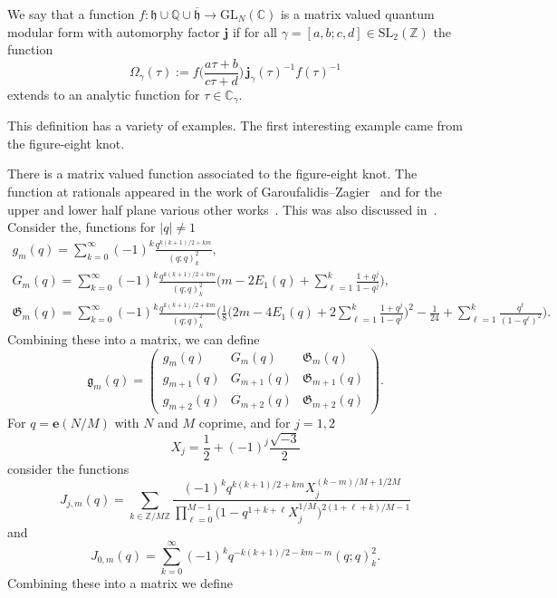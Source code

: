 \documentclass[pdftex]{sigma}
\numberwithin{equation}{section}
\def\BZ{\mathbb{Z}}
\def\BQ{\mathbb{Q}}
\def\BC{\mathbb{C}}
\def\SL{\mathrm{SL}}
\def\be{\begin{equation}}
\def\ee{\end{equation}}
\def\e{\mathbf e}
\def\SL{\mathrm{SL}}
\def\GL{\mathrm{GL}}
\def\UHP{\mathfrak{h}}
\def\Om{\Omega}
\def\BZ{\mathbb Z}
\def\BQ{\mathbb Q}
\def\BC{\mathbb C}
\def\SL{\mathrm{SL}}
\def\be{\begin{equation}}
\def\ee{\end{equation}}
\def\GL{\mathrm{GL}}
\def\Om{\Omega}
\begin{document}
\begin{Definition}
We say that a function $f\colon \UHP\cup\BQ\cup\overline{\UHP}\rightarrow\GL_{N}(\BC)$ is a matrix valued quantum modular form with automorphy factor $\mathbf{j}$ if for all $\gamma=[a,b;c,d]\in\SL_{2}(\BZ)$ the function
\be\label{eq:cocyc}
 \Om_{\gamma}(\tau):=f\biggl(\frac{a\tau+b}{c\tau+d}\biggr)\,\mathbf{j}_{\gamma}(\tau)^{-1}f(\tau)^{-1}
\ee
extends to an analytic function for $\tau\in\BC_{\gamma}$.
\end{Definition}
This definition has a variety of examples. The first interesting example came from the figure-eight knot.
\begin{Example}\label{ex:41}
There is a matrix valued function associated to the figure-eight knot. The function at rationals appeared in the work of Garoufalidis--Zagier~\cite{GK:rat,GZ:RQMOD} and for the upper and lower half plane various other works~\cite{GGM:I,GGMW,GK:qser,GZ:qser}. This was also discussed in~\cite{Wh:thesis}. Consider the, functions for $|q|\neq 1$
\begin{gather*}
 g_{m}(q) =\sum_{k=0}^{\infty}(-1)^{k}\frac{q^{k(k+1)/2+km}}{(q;q)_{k}^2} ,\\
 G_{m}(q) =\sum_{k=0}^{\infty}(-1)^{k}\frac{q^{k(k+1)/2+km}}{(q;q)_{k}^2}\Biggl(m-2E_{1}(q)+\sum_{\ell=1}^{k}\frac{1+q^j}{1-q^j}\Biggr) ,\\
 \mathfrak{G}_{m}(q) =\sum_{k=0}^{\infty}(-1)^{k}\frac{q^{k(k+1)/2+km}}{(q;q)_{k}^2}\Bigg(\frac{1}{8}\Biggl(2m-4E_{1}(q)+2\sum_{\ell=1}^{k}\frac{1+q^j}{1-q^j}\Biggr)^2\!\!-\frac{1}{24}+ \! \sum_{\ell=1}^{k}\frac{q^{\ell}}{(1-q^{\ell})^2}\Bigg) .
\end{gather*}
Combining these into a matrix, we can define
\[
 \mathfrak{g}_{m}(q)
  =
 \begin{pmatrix}
 g_{m}(q) & G_{m}(q) & \mathfrak{G}_{m}(q)\\
 g_{m+1}(q) & G_{m+1}(q) & \mathfrak{G}_{m+1}(q)\\
 g_{m+2}(q) & G_{m+2}(q) & \mathfrak{G}_{m+2}(q)
 \end{pmatrix} .
\]
For $q=\e(N/M)$ with $N$ and $M$ coprime, and for $j=1,2$
\[
 X_{j}
  =\frac{1}{2}+(-1)^{j}\frac{\sqrt{-3}}{2}
\]
consider the functions
\[
 J_{j,m}(q)
  =
 \sum_{k\in\BZ/M\BZ}\frac{(-1)^{k}q^{k(k+1)/2+km}X_{j}^{(k-m)/M+1/2M}}{\prod_{\ell=0}^{M-1}\bigl(1-q^{1+k+\ell}X_{j}^{1/M}\bigr)^{2(1+\ell+k)/M-1}}
\]
and
\[
 J_{0,m}(q)
  =
 \sum_{k=0}^{\infty}(-1)^{k}q^{-k(k+1)/2-km-m}(q;q)_{k}^{2} .
\]
Combining these into a matrix we define

\end{Example}
\end{document}
